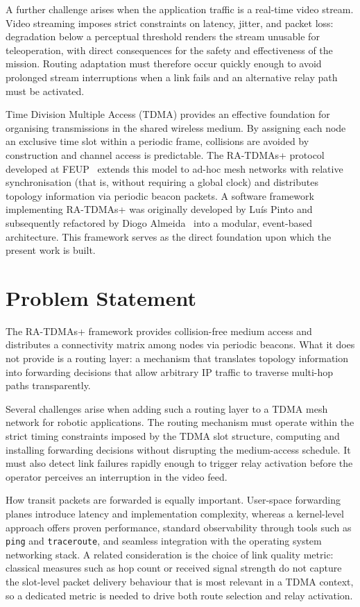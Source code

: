 A further challenge arises when the application traffic is a real-time video
stream. Video streaming imposes strict constraints on latency, jitter, and
packet loss: degradation below a perceptual threshold renders the stream
unusable for teleoperation, with direct consequences for the safety and
effectiveness of the mission. Routing adaptation must therefore occur quickly
enough to avoid prolonged stream interruptions when a link fails and an
alternative relay path must be activated.

Time Division Multiple Access (TDMA) provides an effective foundation for
organising transmissions in the shared wireless medium. By assigning each node
an exclusive time slot within a periodic frame, collisions are avoided by
construction and channel access is predictable. The RA-TDMAs+ protocol
developed at FEUP~\cite{oliveira2018clockless} extends this model to ad-hoc
mesh networks with relative synchronisation (that is, without requiring a
global clock) and distributes topology information via periodic beacon
packets. A software framework implementing RA-TDMAs+ was originally developed
by Luís Pinto and subsequently refactored by Diogo
Almeida~\cite{almeida2023synchronization} into a modular, event-based
architecture. This framework serves as the direct foundation upon which the
present work is built.

\section{Problem Statement}
\label{sec:problem}

The RA-TDMAs+ framework provides collision-free medium access and distributes
a connectivity matrix among nodes via periodic beacons. What it does not
provide is a routing layer: a mechanism that translates topology information
into forwarding decisions that allow arbitrary IP traffic to traverse multi-hop
paths transparently.

Several challenges arise when adding such a routing layer to a TDMA mesh
network for robotic applications. The routing mechanism must operate within the
strict timing constraints imposed by the TDMA slot structure, computing and
installing forwarding decisions without disrupting the medium-access schedule.
It must also detect link failures rapidly enough to trigger relay activation
before the operator perceives an interruption in the video feed.

How transit packets are forwarded is equally important. User-space forwarding
planes introduce latency and implementation complexity, whereas a kernel-level
approach offers proven performance, standard observability through tools such
as \texttt{ping} and \texttt{traceroute}, and seamless integration with the
operating system networking stack. A related consideration is the choice of
link quality metric: classical measures such as hop count or received signal
strength do not capture the slot-level packet delivery behaviour that is most
relevant in a TDMA context, so a dedicated metric is needed to drive both route
selection and relay activation.

